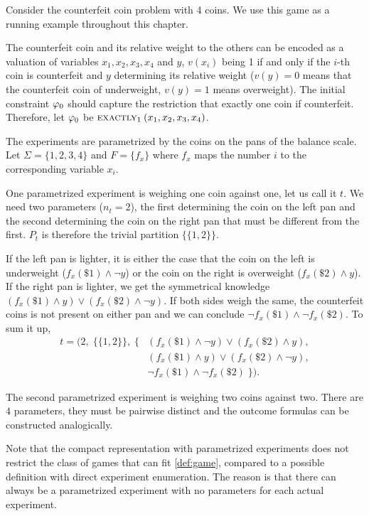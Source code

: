 \begin{example} \label{ex:run1}
Consider the counterfeit coin problem with 4 coins.
We use this game as a running example throughout this chapter.

The counterfeit coin and its relative weight to the others can be encoded
  as a valuation of variables $x_1, x_2, x_3, x_4$ and $y$,
  $v(x_i)$ being 1 if and only if the $i$-th coin is counterfeit and
  $y$ determining its relative weight
  ($v(y) = 0$ means that the counterfeit coin of underweight, $v(y) = 1$ means overweight).
The initial constraint $\varphi_0$ should capture the restriction that exactly one
  coin if counterfeit.
Therefore, let $\varphi_0$ be $\textsc{exactly}_{1}\:(x_1, x_2, x_3, x_4)$.

The experiments are parametrized by the coins on the pans of the balance scale.
Let $\Sigma = \{1, 2, 3, 4\}$ and $F = \{ f_x \}$ where $f_x$
maps the number $i$ to the corresponding variable $x_i$.

One parametrized experiment is weighing one coin against one, let us call it $t$.
We need two parameters ($n_t = 2$),
  the first determining the coin on the left pan and
  the second determining the coin on the right pan that must be different
  from the first.
$P_t$ is therefore the trivial partition $\{\{1, 2\}\}$.

If the left pan is lighter, it is either the case that the
  coin on the left is underweight ($f_x(\$1) \wedge \neg y$)
  or the coin on the right is overweight ($f_x(\$2) \wedge y$).
If the right pan is lighter, we get the symmetrical knowledge
  $(f_x(\$1)\wedge y) \vee (f_x(\$2)\wedge\neg y)$.
If both sides weigh the same, the counterfeit coins is not present on either pan
  and we can conclude $\neg f_x(\$1) \wedge \neg f_x(\$2)$.
To sum it up,
\begin{align*}
  t = \big(2,\; \big\{\{1,2\}\big\},\; \big\{ &
    (f_x(\$1)\wedge \neg y) \vee (f_x(\$2)\wedge y), \\
    & (f_x(\$1)\wedge y) \vee (f_x(\$2)\wedge\neg y), \\
    & \neg f_x(\$1) \wedge \neg f_x(\$2) \;\big\}\big).
\end{align*}

The second parametrized experiment is weighing two coins against two.
There are $4$ parameters, they must be pairwise distinct and the outcome
  formulas can be constructed analogically. \eqed
\end{example}


Note that the compact representation with parametrized experiments
  does not restrict the class of games that can fit \autoref{def:game},
  compared to a possible definition with direct experiment enumeration.
The reason is that there can always be a parametrized experiment
  with no parameters for each actual experiment.

